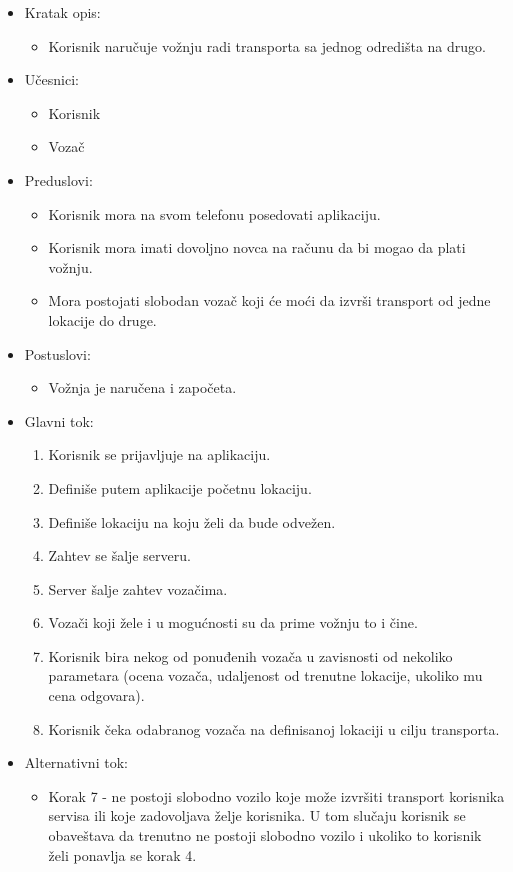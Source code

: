 \begin{itemize}
	\item Kratak opis:
		\begin{itemize}
			\item Korisnik naručuje vožnju radi transporta sa jednog odredišta na drugo.
		\end{itemize}
	\item Učesnici:
		\begin{itemize}
			\item Korisnik
		    \item Vozač
		\end{itemize}				
	\item Preduslovi:
		\begin{itemize}
		    \item Korisnik mora na svom telefonu posedovati aplikaciju.
		    \item Korisnik mora imati dovoljno novca na računu da bi mogao da plati vožnju.
		    \item Mora postojati slobodan vozač koji će moći da izvrši transport od jedne lokacije do druge.
		\end{itemize}
	\item Postuslovi:
		\begin{itemize}
			\item Vožnja je naručena i započeta.
		\end{itemize}		
	\item Glavni tok:
		\begin{enumerate}
		    \item Korisnik se prijavljuje na aplikaciju.
		    \item Definiše putem  aplikacije  početnu lokaciju.
		    \item Definiše lokaciju na koju želi da bude odvežen.
		    \item Zahtev se šalje serveru.
		    \item Server šalje zahtev vozačima.
		    \item Vozači koji žele i u mogućnosti su da prime vožnju to i čine.
		    \item Korisnik bira nekog od ponuđenih vozača u zavisnosti od nekoliko parametara (ocena vozača, udaljenost od trenutne lokacije, ukoliko mu cena odgovara).
		    \item Korisnik čeka odabranog vozača na definisanoj lokaciji u cilju transporta.
		\end{enumerate}
	\item Alternativni tok:
		\begin{itemize}
    		\item Korak 7 - ne postoji slobodno vozilo koje može izvršiti transport korisnika servisa ili koje zadovoljava želje korisnika. U tom slučaju korisnik se obaveštava da trenutno ne postoji slobodno vozilo i ukoliko to korisnik želi ponavlja se korak 4.
		\end{itemize}
\end{itemize}

